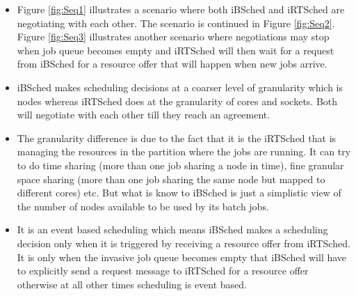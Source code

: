 \begin{itemize}
\item Figure \ref{fig:Seq1} illustrates a scenario where both iBSched and iRTSched are negotiating with each other. The scenario is continued in Figure \ref{fig:Seq2}. Figure \ref{fig:Seq3} illustrates another scenario where negotiations may stop when job queue becomes empty and iRTSched will then wait for a request from iBSched for a resource offer that will happen when new jobs arrive.
\item iBSched makes scheduling decisions at a coarser level of granularity which is nodes whereas iRTSched does at the granularity of cores and sockets. Both will negotiate with each other till they reach an agreement.
\item The granularity difference is due to the fact that it is the iRTSched that is managing the resources in the partition where the jobs are running. It can try to do time sharing (more than one job sharing a node in time), fine granular space sharing (more than one job sharing the same node but mapped to different cores) etc. But what is know to iBSched is just a simplistic view of the number of nodes available to be used by its batch jobs.
\item It is an event based scheduling which means iBSched makes a scheduling decision only when it is triggered by receiving a resource offer from iRTSched. It is only when the invasive job queue becomes empty that iBSched will have to explicitly send a request message to iRTSched for a resource offer otherwise at all other times scheduling is event based.
\end{itemize}
